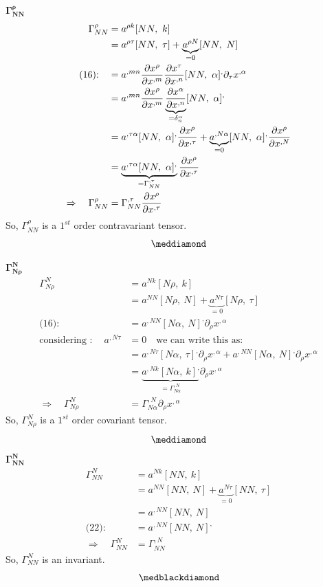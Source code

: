 $\boldsymbol{\Gamma^{\rho}_{N N}}$\\
\begin{align}
\Gamma^{\rho }_{N N} &= a^{\rho  k}[N N,\ k]\\
\ & = a^{\rho \tau}[N N,\ \tau]+ \underbrace{a^{\rho N}}_{=0}[N N,\ N]\\
\text{(16):}\quad &= a^{,mn}\pdv{x^\rho}{x^{,m}}\pdv{x^\tau}{x^{,n}}[NN, \ \alpha]^, \partial_{\tau}x^{,\alpha}\\
\ &= a^{,mn}\pdv{x^\rho}{x^{,m}} \underbrace{\pdv{x^{\alpha}}{x^{,n}}}_{= \delta^{\alpha}_{n}}[NN, \ \alpha]^, \\
\ &= a^{, \tau \alpha}[NN, \ \alpha]^,\pdv{x^\rho}{x^{, \tau}}+  \underbrace{a^{,N \alpha}}_{=0}[NN, \ \alpha]^,\pdv{x^\rho}{x^{,N}} \\
\ &= \underbrace{a^{, \tau \alpha}[NN, \ \alpha]^,}_{= \Gamma^{, \tau}_{NN}}\pdv{x^\rho}{x^{, \tau}}  \\
\Rightarrow \quad \Gamma^{\rho }_{N N} &= \Gamma^{, \tau}_{NN}\pdv{x^\rho}{x^{, \tau}}  
\end{align}
So, $\Gamma^{\rho }_{N N}$ is a $1^{st}$ order contravariant tensor.
$$\meddiamond$$

$\boldsymbol{\Gamma^{N}_{N \rho}}$\\
\begin{align}
\Gamma^{N}_{N \rho} &= a^{N  k}[N \rho,\ k]\\
\ & = a^{N N}[N \rho,\ N]+ \underbrace{a^{N \tau}}_{=0}[N \rho,\ \tau]\\
\text{(16):}\quad &= a^{,NN}[N\alpha, \ N ]^, \partial_{\rho}x^{,\alpha}\\
\text{considering :}\quad \ a^{,N \tau} & =0 \quad \text{we can write this as:}\\
\ &= a^{,N\tau}[N\alpha, \ \tau ]^, \partial_{\rho}x^{,\alpha}+ a^{,NN}[N\alpha, \ N ]^, \partial_{\rho}x^{,\alpha}\\
\ &= \underbrace{a^{,N k}[N \alpha, \ k ]^,}_{= \Gamma^{,N}_{N \alpha}} \partial_{\rho}x^{,\alpha}\\
\Rightarrow \quad \Gamma^{N}_{N \rho} &= \Gamma^{,N}_{N \alpha} \partial_{\rho}x^{,\alpha}
\end{align}
So, $\Gamma^{N}_{N \rho}$ is a $1^{st}$ order covariant tensor.
$$\meddiamond$$
\newpage
$\boldsymbol{\Gamma^{N}_{N N}}$\\
\begin{align}
\Gamma^{N}_{N N} &= a^{N  k}[N N,\ k]\\
\ & = a^{N N}[N N,\ N]+ \underbrace{a^{N \tau}}_{=0}[N N,\ \tau]\\
\ & = a^{,N N}[N N,\ N]\\
\text{(22):}\quad &= a^{,N N}[N N,\ N]^,\\
\Rightarrow \quad \Gamma^{N}_{N N} &= \Gamma^{,N}_{N N}
\end{align}
So, $\Gamma^{N}_{N N}$ is an invariant.
$$\medblackdiamond$$
\newpage
